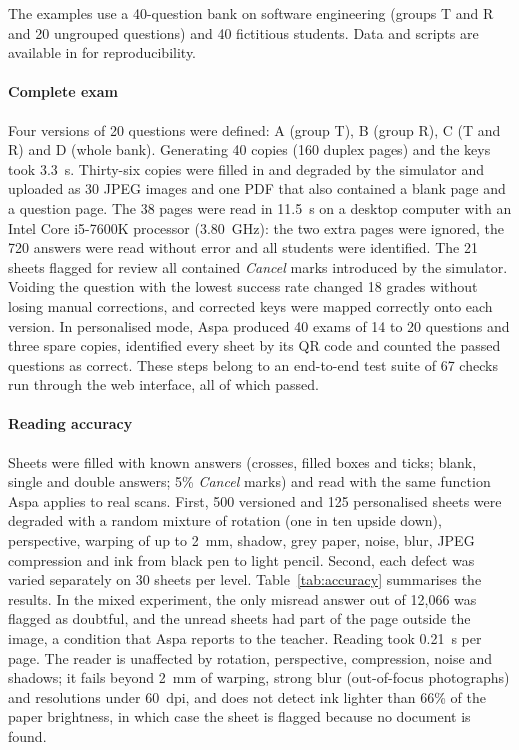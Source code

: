 \documentclass[preprint,12pt, a4paper]{elsarticle}
\begin{document}
The examples use a 40-question bank on software engineering (groups T and R and 20 ungrouped questions) and 40 fictitious students. Data and scripts are available in  for reproducibility.

\paragraph{Complete exam} Four versions of 20 questions were defined: A (group T), B (group R), C (T and R) and D (whole bank). Generating 40 copies (160 duplex pages) and the keys took 3.3~s. Thirty-six copies were filled in and degraded by the simulator and uploaded as 30 JPEG images and one PDF that also contained a blank page and a question page. The 38 pages were read in 11.5~s on a desktop computer with an Intel Core i5-7600K processor (3.80~GHz): the two extra pages were ignored, the 720 answers were read without error and all students were identified. The 21 sheets flagged for review all contained \emph{Cancel} marks introduced by the simulator. Voiding the question with the lowest success rate changed 18 grades without losing manual corrections, and corrected keys were mapped correctly onto each version. In personalised mode, Aspa produced 40 exams of 14 to 20 questions and three spare copies, identified every sheet by its QR code and counted the passed questions as correct. These steps belong to an end-to-end test suite of 67 checks run through the web interface, all of which passed.

\paragraph{Reading accuracy} Sheets were filled with known answers (crosses, filled boxes and ticks; blank, single and double answers; 5\% \emph{Cancel} marks) and read with the same function Aspa applies to real scans. First, 500 versioned and 125 personalised sheets were degraded with a random mixture of rotation (one in ten upside down), perspective, warping of up to 2~mm, shadow, grey paper, noise, blur, JPEG compression and ink from black pen to light pencil. Second, each defect was varied separately on 30 sheets per level. Table~\ref{tab:accuracy} summarises the results. In the mixed experiment, the only misread answer out of 12,066 was flagged as doubtful, and the unread sheets had part of the page outside the image, a condition that Aspa reports to the teacher. Reading took 0.21~s per page. The reader is unaffected by rotation, perspective, compression, noise and shadows; it fails beyond 2~mm of warping, strong blur (out-of-focus photographs) and resolutions under 60~dpi, and does not detect ink lighter than 66\% of the paper brightness, in which case the sheet is flagged because no document is found.
\end{document}
